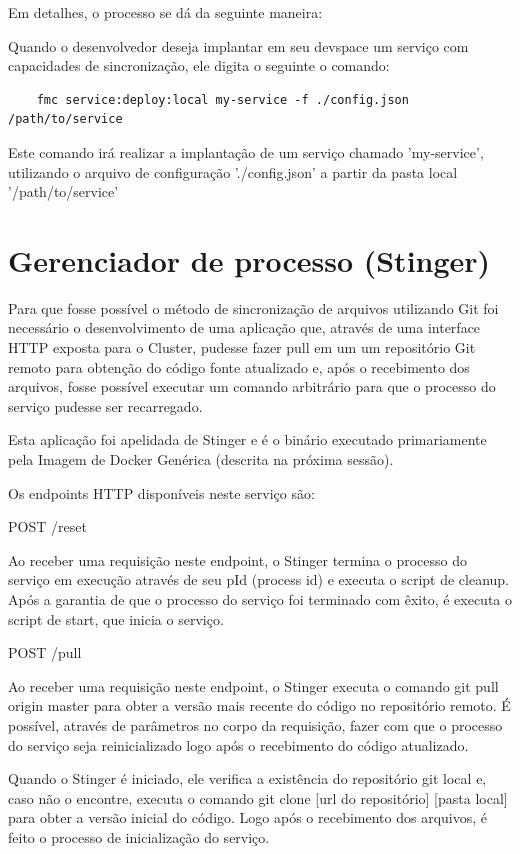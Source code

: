 \documentclass[]{politex}
\begin{document}
	Em detalhes, o processo se dá da seguinte maneira:
	
	Quando o desenvolvedor deseja implantar em seu devspace um serviço com capacidades de sincronização, ele digita o seguinte o comando:

	\begin{verbatim}
	fmc service:deploy:local my-service -f ./config.json /path/to/service
	\end{verbatim}

	Este comando irá realizar a implantação de um serviço chamado 'my-service', utilizando o arquivo de configuração './config.json' a partir da pasta local '/path/to/service'

	\section{Gerenciador de processo (Stinger)}	
	
	Para que fosse possível o método de sincronização de arquivos utilizando Git foi necessário o desenvolvimento de uma aplicação que, através de uma interface HTTP exposta para o Cluster, pudesse fazer pull em um um repositório Git remoto para obtenção do código fonte atualizado e, após o recebimento dos arquivos, fosse possível executar um comando arbitrário para que o processo do serviço pudesse ser recarregado.
	
	Esta aplicação foi apelidada de Stinger e é o binário executado primariamente pela Imagem de Docker Genérica (descrita na próxima sessão).
	
	Os endpoints HTTP disponíveis neste serviço são:

	POST /reset
	
	Ao receber uma requisição neste endpoint, o Stinger termina o processo do serviço em execução através de seu pId (process id) e executa o script de cleanup. Após a garantia de que o processo do serviço foi terminado com êxito, é executa o script de start, que inicia o serviço.
	
	POST /pull
	
	Ao receber uma requisição neste endpoint, o Stinger executa o comando git pull origin master para obter a versão mais recente do código no repositório remoto. É possível, através de parâmetros no corpo da requisição, fazer com que o processo do serviço seja reinicializado logo após o recebimento do código atualizado.

	Quando o Stinger é iniciado, ele verifica a existência do repositório git local e, caso não o encontre, executa o comando git clone [url do repositório] [pasta local] para obter a versão inicial do código. Logo após o recebimento dos arquivos, é feito o processo de inicialização do serviço.
\end{document}
